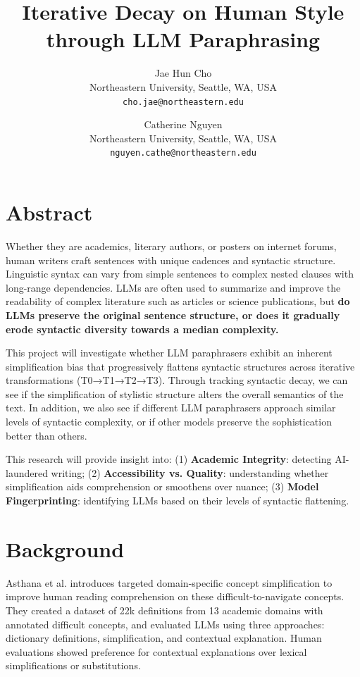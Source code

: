\documentclass[10pt,twocolumn]{article}
\title{\textbf{Iterative Decay on Human Style through LLM Paraphrasing}}
\author{Jae Hun Cho\\
  Northeastern University, Seattle, WA, USA\\
  \texttt{cho.jae@northeastern.edu}
  \and
  Catherine Nguyen\\
  Northeastern University, Seattle, WA, USA\\
  \texttt{nguyen.cathe@northeastern.edu}
}
\date{}
\renewenvironment{abstract}{%
  \small\bfseries Abstract ---\normalfont\small\hspace{0.5em}%
}{}
\begin{document}
\maketitle


\section{Abstract}

Whether they are academics, literary authors, or posters on internet forums, human writers craft sentences with unique cadences and syntactic structure. Linguistic syntax can vary from simple sentences to complex nested clauses with long-range dependencies. LLMs are often used to summarize and improve the readability of complex literature such as articles or science publications, but \textbf{do LLMs preserve the original sentence structure, or does it gradually erode syntactic diversity towards a median complexity.}

This project will investigate whether LLM paraphrasers exhibit an inherent simplification bias that progressively flattens syntactic structures across iterative transformations (T0→T1→T2→T3). Through tracking syntactic decay, we can see if the simplification of stylistic structure alters the overall semantics of the text. In addition, we also see if different LLM paraphrasers approach similar levels of syntactic complexity, or if other models preserve the sophistication better than others.

This research will provide insight into: (1) \textbf{Academic Integrity}: detecting AI-laundered writing; (2) \textbf{Accessibility vs. Quality}: understanding whether simplification aids comprehension or smoothens over nuance; (3) \textbf{Model Fingerprinting}: identifying LLMs based on their levels of syntactic flattening.

\section{Background}

Asthana et al.\cite{asthana2024} introduces targeted domain-specific concept simplification to improve human reading comprehension on these difficult-to-navigate concepts. They created a dataset of 22k definitions from 13 academic domains with annotated difficult concepts, and evaluated LLMs using three approaches: dictionary definitions, simplification, and contextual explanation. Human evaluations showed preference for contextual explanations over lexical simplifications or substitutions.
\end{document}
